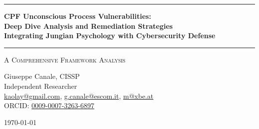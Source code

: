 \documentclass[11pt,a4paper]{article}
\begin{document}
\thispagestyle{empty}
\begin{center}

\vspace*{0.5cm}

\rule{\textwidth}{1.5pt}

\vspace{0.5cm}

{\LARGE \textbf{CPF Unconscious Process Vulnerabilities:}}\\[0.3cm]
{\LARGE \textbf{Deep Dive Analysis and Remediation Strategies}}\\[0.3cm]
{\LARGE \textbf{Integrating Jungian Psychology with Cybersecurity Defense}}

\vspace{0.5cm}

\rule{\textwidth}{1.5pt}

\vspace{0.3cm}

{\large \textsc{A Comprehensive Framework Analysis}}

\vspace{0.5cm}

{\Large Giuseppe Canale, CISSP}\\[0.2cm]
Independent Researcher\\[0.1cm]
\href{mailto:kaolay@gmail.com}{kaolay@gmail.com}, 
\href{mailto:g.canale@escom.it}{g.canale@escom.it}, 
\href{mailto:m8xbe.at}{m@xbe.at}\\[0.1cm]
ORCID: \href{https://orcid.org/0009-0007-3263-6897}{0009-0007-3263-6897}

\vspace{0.8cm}

{\large \today}

\vspace{1cm}

\end{center}
\end{document}
